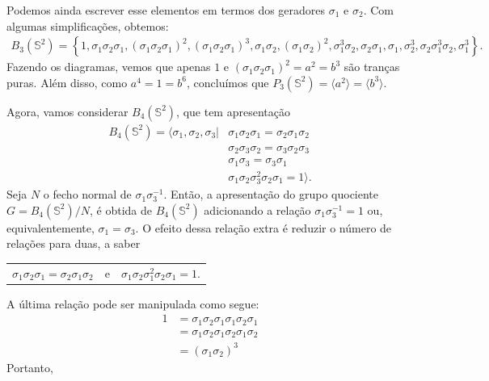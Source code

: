 	Podemos ainda escrever esse elementos em termos dos geradores $\sigma_1$ e $\sigma_2$. 
	Com algumas simplificações, obtemos:
	\begin{align*}
    	B_3(\mathbb{S}^2) 
    	= \left\{ 1, \sigma_1\sigma_2\sigma_1, (\sigma_1\sigma_2\sigma_1)^2, 
    	(\sigma_1\sigma_2\sigma_1)^3, \sigma_1\sigma_2, (\sigma_1\sigma_2)^2, \sigma_1^3\sigma_2,
    	\sigma_2\sigma_1, \sigma_1, \sigma_2^3, \sigma_2\sigma_1^3\sigma_2, \sigma_1^3 \right \}.
	\end{align*}
	Fazendo os diagramas, vemos que apenas $1$ e $(\sigma_1\sigma_2\sigma_1)^2 = a^2 = b^3$ 
	são tranças puras. Além disso, como $a^4 = 1 = b^6$, concluímos que 
	$P_3(\mathbb{S}^2) = \langle a^2 \rangle = \langle b^3 \rangle$.
	
	\par\vspace{0.3cm} Agora, vamos considerar $B_4(\mathbb{S}^2)$, que tem apresentação
	\begin{align*}
	    B_4(\mathbb{S}^2) 
	    = \langle \sigma_1, \sigma_2, \sigma_3| &\sigma_1\sigma_2\sigma_1 
	    = \sigma_2\sigma_1\sigma_2 \\ 
	    &\sigma_2\sigma_3\sigma_2 
	    = \sigma_3\sigma_2\sigma_3 \\
    	&\sigma_1\sigma_3 = \sigma_3\sigma_1 \\
    	&\sigma_1\sigma_2\sigma_3^2\sigma_2\sigma_1 = 1\rangle.
	\end{align*}
	Seja $N$ o fecho normal de $\sigma_1\sigma_3^{-1}$. Então, a apresentação do grupo quociente 
	$G = B_4(\mathbb{S}^2)/N$, é obtida de $B_4(\mathbb{S}^2)$ adicionando a relação 
	$\sigma_1\sigma_3^{-1} = 1$ ou, equivalentemente, $\sigma_1=\sigma_3$. 
	O efeito dessa relação extra é reduzir o número de relações para duas, a saber
	\begin{center}
		\begin{tabular}{ccc}
			$\sigma_1\sigma_2\sigma_1 = \sigma_2\sigma_1\sigma_2$ & e &
			$\sigma_1\sigma_2\sigma_1^2\sigma_2\sigma_1 = 1$.
		\end{tabular}
	\end{center}
	A última relação pode ser manipulada como segue:
	\begin{align*}
    	1 &= \sigma_1\sigma_2\sigma_1\sigma_1\sigma_2\sigma_1 \\
    	&= \sigma_1\sigma_2\sigma_1\sigma_2\sigma_1\sigma_2 \\ 
    	&= (\sigma_1\sigma_2)^3
	\end{align*}
	Portanto, 
